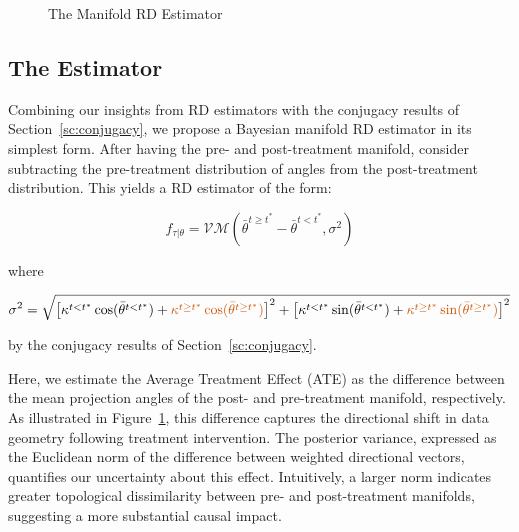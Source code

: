 \documentclass[twoside,11pt]{article}
\begin{document}
\begin{figure}
\begin{center}
  \end{center}
  \caption{The Manifold RD Estimator}\label{fig:manifold-rd}
\end{figure}

\subsection{The Estimator}

Combining our insights from RD estimators with the conjugacy results of Section~\ref{sc:conjugacy}, we propose a Bayesian manifold RD estimator in its simplest form. After having the pre- and post-treatment manifold, consider subtracting the pre-treatment distribution of angles from the post-treatment distribution. This yields a RD estimator of the form: 

$$
f_{\tau | \theta} = 
\mathcal{VM}
\left(
  \bar{\theta}^{t \geq t^*} - \bar{\theta}^{t < t^*}, \sigma^2 
\right)
$$ 

where 

\[
  \sigma^2 = \sqrt{\left[\kappa^{t < t^*}\cos(\bar{\theta}^{t < t^*}) + \textcolor{darkorange}{\kappa^{t \geq t^*}\cos(\bar{\theta}^{t \geq t^*})}\right]^2 
  + 
\left[\kappa^{t < t^*}\sin(\bar{\theta}^{t < t^*}) + \textcolor{darkorange}{\kappa^{t \geq t^*}\sin(\bar{\theta}^{t \geq t^*})}\right]^2}
\]

by the conjugacy results of Section~\ref{sc:conjugacy}. 

Here, we estimate the Average Treatment Effect (ATE) as the difference between the mean projection angles of the post- and pre-treatment manifold, respectively. As illustrated in Figure~\ref{fig:manifold-rd}, this difference captures the directional shift in data geometry following treatment intervention. The posterior variance, expressed as the Euclidean norm of the difference between weighted directional vectors, quantifies our uncertainty about this effect. Intuitively, a larger norm indicates greater topological dissimilarity between pre- and post-treatment manifolds, suggesting a more substantial causal impact.
\end{document}
